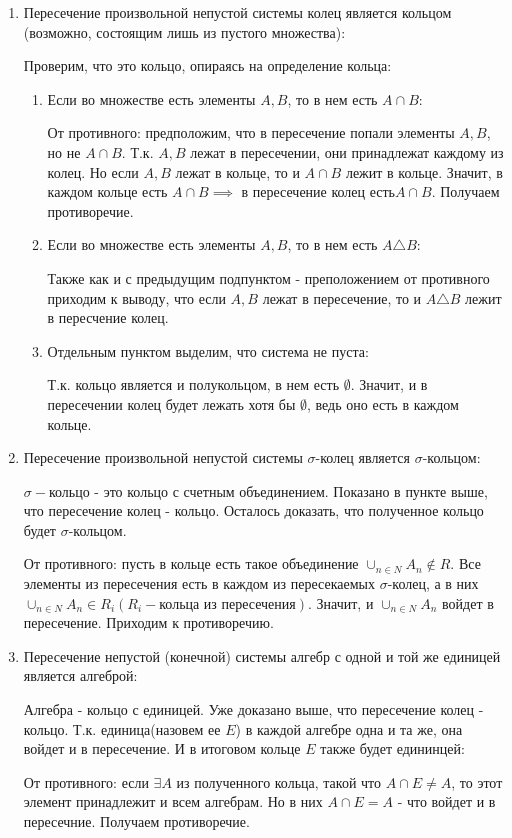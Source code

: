 \documentclass{article}
\begin{document}
\begin{enumerate}
\item Пересечение произвольной непустой системы колец является кольцом (возможно, состоящим лишь из пустого множества):

Проверим, что это кольцо, опираясь на определение кольца:

\begin{enumerate}
\item Если во множестве есть элементы $A, B$, то в нем есть $A \cap B$:

От противного: предположим, что в пересечение попали элементы $A, B$, но не $A \cap B$. Т.к. $A, B$ лежат в пересечении, они принадлежат каждому из колец. Но если $A, B$ лежат в кольце, то и $A \cap B$ лежит в кольце. Значит, в каждом кольце есть $A \cap B \implies$ в пересечение колец есть$A \cap B$. Получаем противоречие.

\item  Если во множестве есть элементы $A, B$, то в нем есть $A \triangle B$:

Также как и с предыдущим подпунктом - преположением от противного приходим к выводу, что если $A, B$ лежат в пересечение, то и  $A \triangle B$ лежит в пересчение колец.

\item Отдельным пунктом выделим, что система не пуста:

Т.к. кольцо является и полукольцом, в нем есть $\emptyset$. Значит, и в пересечении колец будет лежать хотя бы $\emptyset$, ведь оно есть в каждом кольце.
\end{enumerate}

\item Пересечение произвольной непустой системы $\sigma$-колец является $\sigma$-кольцом:

$\sigma-$кольцо - это кольцо с счетным объединением. Показано в пункте выше, что пересечение колец - кольцо. Осталось доказать, что полученное кольцо будет $\sigma$-кольцом. 

От противного: пусть в кольце есть такое объединение $\cup_{n \in N}A_n \notin R$. 
Все элементы из пересечения есть в каждом из пересекаемых $\sigma$-колец, а в них 
$\cup_{n \in N}A_n \in R_i (R_i - \text{кольца из пересечения})$. Значит, и $\cup_{n \in N}A_n$ войдет в пересечение. Приходим к противоречию.

\item Пересечение непустой (конечной) системы алгебр с одной и той же единицей является алгеброй:

Алгебра - кольцо с единицей. Уже доказано выше, что пересечение колец - кольцо. Т.к. единица(назовем ее $E$) в каждой алгебре одна и та же, она войдет и в пересечение. И в итоговом кольце $E$ также будет едининцей:

От противного: если $\exists A \text{ из полученного кольца, такой что } A \cap E \neq A$, то этот элемент принадлежит и всем алгебрам. Но в них $A \cap E = A$ - что войдет и в пересечние. Получаем противоречие.

\end{enumerate}
\end{document}
